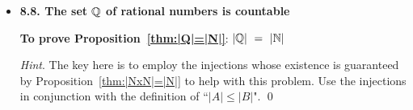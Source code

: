 \begin{itemize}
\smallskip

Say that each subset-$k$ element $2^k m$ of $S$ is {\it associated with} its odd divisor $m$.

\medskip

Now, since set $S$ consists of the first $2n$ integers, it contains $n$ {\em odd} integers.  Since our challenge begins by removing $n+1$ elements from $S$, the Pigeonhole Principle assures us that some two of the removed integers are {\em associated with} the same odd number $m$.  Stated differently: some removed integer has the form $2^{k_1} \times m$ while another has the form $2^{k_2} \times m$.

\smallskip

The smaller of these removed integers divides the larger one.  \qed


\medskip\item
{\bf 8.8. The set $\mathbb{Q}$ of rational numbers is countable}

\smallskip

{\bf To prove Proposition~\ref{thm:|Q|=|N|}}: $|\mathbb{Q}| \ = \ |\mathbb{N}|$

\smallskip

{\em Hint}.
The key here is to employ the injections whose existence is guaranteed by Proposition~\ref{thm:|NxN|=|N|} to help with this problem.   Use the injections in conjunction with the definition of ``$|A| \leq |B|$".   \qed
\end{itemize}




